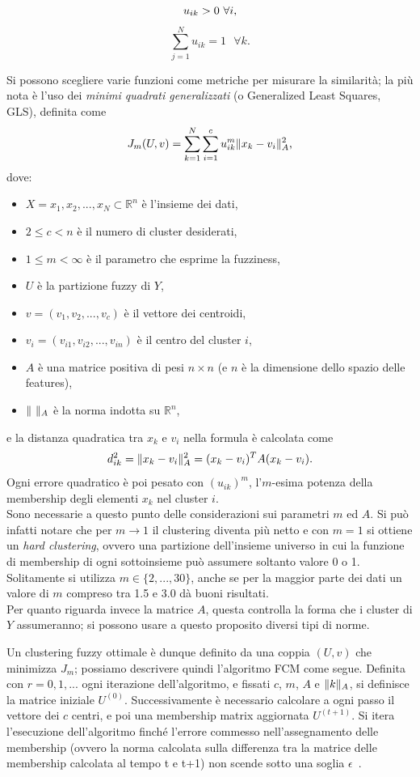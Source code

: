\documentclass[oneside, openany]{book}
\DeclarePairedDelimiter{\norma}{\lVert}{\rVert}
\begin{document}
		\[
		u_{ik} > 0\text{ } \forall i\text{,}\\
		\]
		\[
		\sum_{j=1}^{N}u_{ik} = 1 \text{ }\forall k\text{.}
		\]
		
		Si possono scegliere varie funzioni come metriche per misurare la similarità; la più nota è l'uso dei \textit{minimi quadrati generalizzati} (o Generalized Least Squares, GLS), definita come
		\[
			J_m(U, v)=\sum_{k=1}^{N}\sum_{i=1}^{c}u_{ik}^m\norma{x_k-v_i}^2_A\text{,}
		\]
		dove:
		\begin{itemize}
			\item $X = {x_1, x_2, ..., x_N} \subset \mathbb{R}^n$ è l'insieme dei dati, 
			\item $2 \leq c < n$ è il numero di cluster desiderati,
			\item $1 \leq m <\infty$ è il parametro che esprime la fuzziness,
			\item $U$ è la partizione fuzzy di $Y$,
			\item $v = (v_1, v_2, ..., v_c)$ è il vettore dei centroidi,
			\item $v_i = (v_{i1}, v_{i2}, ..., v_{in})$ è il centro del cluster $i$,
			\item $A$ è una matrice positiva di pesi $n\times n$ (e $n$ è la dimensione dello spazio delle features),
			\item $\norma{\textit{ }}_A$ è la norma indotta su $\mathbb{R}^n$,
			
		\end{itemize}
		e la distanza quadratica tra $x_k$ e $v_i$ nella formula è calcolata come
		\[
			d^2_{ik} = \norma{x_k-v_i}^2_A = (x_k-v_i)^TA(x_k-v_i)\text{.}
		\] 	
		Ogni errore quadratico è poi pesato con $(u_{ik})^m$, l'$m$-esima potenza della membership degli elementi $x_k$ nel cluster $i$.\\
		Sono necessarie a questo punto delle considerazioni sui parametri $m$ ed $A$. Si può infatti notare che per $m\rightarrow 1$ il clustering diventa più netto e con $m=1$ si ottiene un \textit{hard clustering}, ovvero una partizione dell'insieme universo in cui la funzione di membership di ogni sottoinsieme può assumere soltanto valore 0 o 1. Solitamente si utilizza $m \in\{2,...,30\}$, anche se per la maggior parte dei dati un valore di $m$ compreso tra 1.5 e 3.0 dà buoni risultati. \\
		Per quanto riguarda invece la matrice $A$, questa controlla la forma che i cluster di $Y$ assumeranno; si possono usare a questo proposito diversi tipi di norme.
		
		Un clustering fuzzy ottimale è dunque definito da una coppia $(U, v)$ che minimizza $J_m$; possiamo descrivere quindi l'algoritmo FCM come segue.
		Definita con $r=0,1, ...$ ogni iterazione dell'algoritmo, e fissati $c$, $m$, $A$ e $\norma{k}_A$, si definisce la matrice iniziale $U^{(0)}$. Successivamente è necessario calcolare a ogni passo il vettore dei $c$ centri, e poi una membership matrix aggiornata $U^{(t+1)}$. Si itera l'esecuzione dell'algoritmo finché l'errore commesso nell'assegnamento delle membership (ovvero la norma calcolata sulla differenza tra la matrice delle membership calcolata al tempo t e t+1) non scende sotto una soglia $\epsilon$~\cite{bib:fcm}.
		
\end{document}
